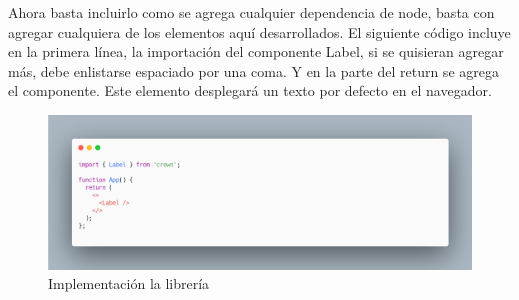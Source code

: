 Ahora basta incluirlo como se agrega cualquier dependencia de node, basta con agregar cualquiera de los elementos aquí desarrollados.
El siguiente código incluye en la primera línea, la importación del componente Label, si se quisieran agregar más, debe enlistarse espaciado por una coma. Y en la parte del return se agrega el componente. Este elemento desplegará un texto por defecto en el navegador.
\begin{figure}[H]
    \includegraphics[width=1\textwidth]{./Imagenes/9.6.png}
   \centering 
    \caption[Implementación la librería]{Implementación la librería}
    \end{figure}
\newline